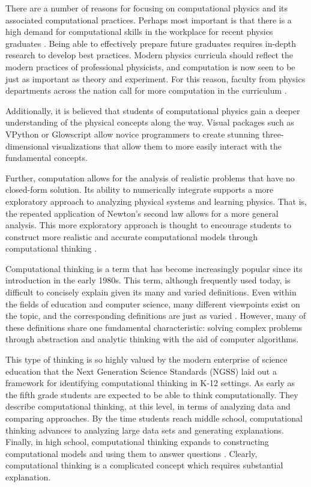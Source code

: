 \documentclass{msuphddissertation}
\begin{document}
\begin{doublespace}
There are a number of reasons for focusing on computational physics and its associated computational practices.  Perhaps most important is that there is a high demand for computational skills in the workplace for recent physics graduates \cite{AAPT2016}.  Being able to effectively prepare future graduates requires in-depth research to develop best practices.  Modern physics curricula should reflect the modern practices of professional physicists, and computation is now seen to be just as important as theory and experiment.  For this reason, faculty from physics departments across the nation call for more computation in the curriculum \cite{Chonacky2008}.  %

Additionally, it is believed that students of computational physics gain a deeper understanding of the physical concepts \cite{Chabay2008,Kohlmyer2005} along the way.  Visual packages such as VPython or Glowscript \cite{Sherer2000} allow novice programmers to create stunning three-dimensional visualizations that allow them to more easily interact with the fundamental concepts.

Further, computation allows for the analysis of realistic problems that have no closed-form solution.  Its ability to numerically integrate supports a more exploratory approach to analyzing physical systems and learning physics.  That is, the repeated application of Newton's second law allows for a more general analysis.  This more exploratory approach is thought to encourage students to construct more realistic and accurate computational models through computational thinking \cite{AAPT2016}.

Computational thinking is a term that has become increasingly popular since its introduction in the early 1980s.  This term, although frequently used today, is difficult to concisely explain given its many and varied definitions.  Even within the fields of education and computer science, many different viewpoints exist on the topic, and the corresponding definitions are just as varied \cite{Grover2013}.  However, many of these definitions share one fundamental characteristic: solving complex problems through abstraction and analytic thinking with the aid of computer algorithms.

This type of thinking is so highly valued by the modern enterprise of science education that the Next Generation Science Standards (NGSS) laid out a framework for identifying computational thinking in K-12 settings.  As early as the fifth grade students are expected to be able to think computationally.  They describe computational thinking, at this level, in terms of analyzing data and comparing approaches.  By the time students reach middle school, computational thinking advances to analyzing large data sets and generating explanations.  Finally, in high school, computational thinking expands to constructing computational models and using them to answer questions \cite{NGSS2012}.  Clearly, computational thinking is a complicated concept which requires substantial explanation.


\end{doublespace}
\end{document}
